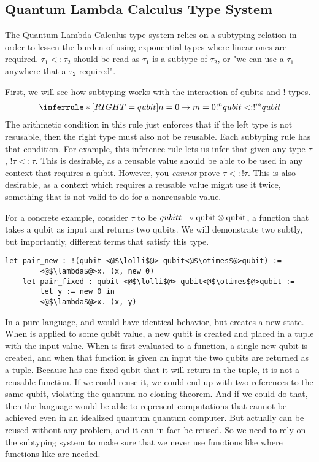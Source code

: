 \subsection{Quantum Lambda Calculus Type System}
The Quantum Lambda Calculus type system relies on a subtyping relation in order to lessen the burden of using exponential types where linear ones are required.
$\tau_1 <: \tau_2$ should be read as $\tau_1$ is a subtype of $\tau_2$, or "we can use a $\tau_1$ anywhere that a $\tau_2$ required".

First, we will see how subtyping works with the interaction of qubits and $!$ types.
\begin{align*}
    \inferrule*[RIGHT=qubit]{n = 0 \rightarrow m = 0}{!^nqubit <: !^m qubit}
\end{align*}
The arithmetic condition in this rule just enforces that if the left type is not resusable, then the right type must also not be reusable.
Each subtyping rule has that condition.
For example, this inference rule lets us infer that given any type $\tau$, $!\tau <:\tau$. 
This is desirable, as a reusable value should be able to be used in any context that requires a qubit.
However, you \textit{cannot} prove $\tau <: !\tau$.
This is also desirable, as a context which requires a reusable value might use it twice, something that is not valid to do for a nonreusable value.

For a concrete example, consider $\tau$ to be $qubitt\multimap \text{qubit}\otimes\text{qubit}$, a function that takes a qubit as input and returns two qubits.
We will demonstrate two subtly, but importantly, different terms that satisfy this type.

\begin{lstlisting}[style=customcoq]
    let pair_new : !(qubit <@$\lolli$@> qubit<@$\otimes$@>qubit) :=
        <@$\lambda$@>x. (x, new 0)
    let pair_fixed : qubit <@$\lolli$@> qubit<@$\otimes$@>qubit :=
        let y := new 0 in
        <@$\lambda$@>x. (x, y)
\end{lstlisting}

In a pure language,  and  would have identical behavior, but  creates a new state.
When  is applied to some qubit value, a new qubit is created and placed in a tuple with the input value.
When  is first evaluated to a function, a single new qubit is created, and when that function is given an input the two qubits are returned as a tuple.
Because  has one fixed qubit that it will return in the tuple, it is not a reusable function.
If we could reuse it, we could end up with two references to the same qubit, violating the quantum no-cloning theorem.
And if we could do that, then the language would be able to represent computations that cannot be achieved even in an idealized quantum quantum computer.
But  actually can be reused without any problem, and it can in fact be reused.
So we need to rely on the subtyping system to make sure that we never use functions like  where functions like  are needed.


